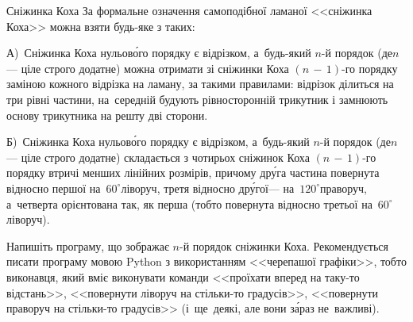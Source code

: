 \begin{problemNoEjudge}{Сніжинка Коха}
За формальне означення самоподібної ламаної <<сніжинка Коха>> можна взяти будь-яке з таких:

А)~Сніжинка Коха нульов\'{о}го порядку є відрізком, а~будь-який \mbox{$n$-й} порядок (де\nolinebreak[3] $n$\nolinebreak[3] --- ціле строго додатне) можна отримати зі сніжинки Коха $(n\,{-}\,1)$-го порядку заміною кожного відрізка на ламану, за такими правилами: відрізок ділиться на три рівні частини, на~середній будують рівносторонній трикутник і замнюють основу трикутника на решту дві сторони.

Б)~Сніжинка Коха нульов\'{о}го порядку є відрізком, а~будь-який \mbox{$n$-й} порядок (де\nolinebreak[3] $n$\nolinebreak[3] --- ціле строго додатне) складається з чотирьох сніжинок Коха \mbox{$(n\,{-}\,1)$-го} порядку втричі менших лінійних розмірів, причому др\'{у}га частина повернута відносно першої на~$60^\circ$\nolinebreak[2] ліворуч, третя відносно др\'{у}гої\nolinebreak[3] --- на~$120^\circ$\nolinebreak[2] праворуч, а~четверта орієнтована так, як перша (тобто повернута відносно третьої на~$60^\circ$\nolinebreak[3] \mbox{ліворуч}).

Напишіть програму, що зображає \mbox{$n$-й} порядок сніжинки Коха.
Рекомендується писати програму мовою Python з використанням <<черепашої графіки>>, тобто виконавця, який вміє виконувати команди 
<<проїхати вперед на таку-то відстань>>, 
<<повернути ліворуч на стільки-то градусів>>, 
<<повернути праворуч на стільки-то градусів>>
(і~ще~деякі, але вони з\'{а}раз не~важливі).

\end{problemNoEjudge}

